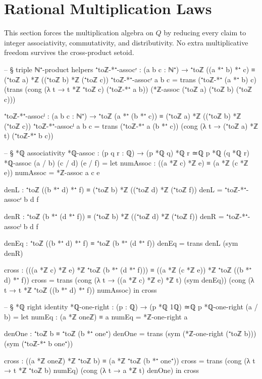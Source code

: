 \documentclass[11pt,a4paper]{book}
\def\mathbb#1{#1}%
\begin{document}
\section{Rational Multiplication Laws}

This section forces the multiplication algebra on $\mathbb{Q}$ by reducing every
claim to integer associativity, commutativity, and distributivity.  No extra
multiplicative freedom survives the cross-product setoid.

\begin{code}
-- § triple ℕ⁺-product helpers
⁺toℤ-*⁺-assocʳ : (a b c : ℕ⁺) → ⁺toℤ ((a *⁺ b) *⁺ c) ≡ (⁺toℤ a) *ℤ ((⁺toℤ b) *ℤ (⁺toℤ c))
⁺toℤ-*⁺-assocʳ a b c =
  trans
    (⁺toℤ-*⁺ (a *⁺ b) c)
    (trans
      (cong (λ t → t *ℤ ⁺toℤ c) (⁺toℤ-*⁺ a b))
      (*ℤ-assoc (⁺toℤ a) (⁺toℤ b) (⁺toℤ c)))

⁺toℤ-*⁺-assocˡ : (a b c : ℕ⁺) → ⁺toℤ (a *⁺ (b *⁺ c)) ≡ (⁺toℤ a) *ℤ ((⁺toℤ b) *ℤ (⁺toℤ c))
⁺toℤ-*⁺-assocˡ a b c =
  trans
    (⁺toℤ-*⁺ a (b *⁺ c))
    (cong (λ t → (⁺toℤ a) *ℤ t) (⁺toℤ-*⁺ b c))

-- § *ℚ associativity
*ℚ-assoc : (p q r : ℚ) → (p *ℚ q) *ℚ r ≃ℚ p *ℚ (q *ℚ r)
*ℚ-assoc (a / b) (c / d) (e / f) =
  let
    numAssoc : ((a *ℤ c) *ℤ e) ≡ (a *ℤ (c *ℤ e))
    numAssoc = *ℤ-assoc a c e

    denL : ⁺toℤ ((b *⁺ d) *⁺ f) ≡ (⁺toℤ b) *ℤ ((⁺toℤ d) *ℤ (⁺toℤ f))
    denL = ⁺toℤ-*⁺-assocʳ b d f

    denR : ⁺toℤ (b *⁺ (d *⁺ f)) ≡ (⁺toℤ b) *ℤ ((⁺toℤ d) *ℤ (⁺toℤ f))
    denR = ⁺toℤ-*⁺-assocˡ b d f

    denEq : ⁺toℤ ((b *⁺ d) *⁺ f) ≡ ⁺toℤ (b *⁺ (d *⁺ f))
    denEq = trans denL (sym denR)

    cross : (((a *ℤ c) *ℤ e) *ℤ ⁺toℤ (b *⁺ (d *⁺ f))) ≡ ((a *ℤ (c *ℤ e)) *ℤ ⁺toℤ ((b *⁺ d) *⁺ f))
    cross =
      trans
        (cong (λ t → ((a *ℤ c) *ℤ e) *ℤ t) (sym denEq))
        (cong (λ t → t *ℤ ⁺toℤ ((b *⁺ d) *⁺ f)) numAssoc)
  in
  cross

-- § *ℚ right identity
*ℚ-one-right : (p : ℚ) → (p *ℚ 1ℚ) ≃ℚ p
*ℚ-one-right (a / b) =
  let
    numEq : (a *ℤ oneℤ) ≡ a
    numEq = *ℤ-one-right a

    denOne : ⁺toℤ b ≡ ⁺toℤ (b *⁺ one⁺)
    denOne =
      trans
        (sym (*ℤ-one-right (⁺toℤ b)))
        (sym (⁺toℤ-*⁺ b one⁺))

    cross : ((a *ℤ oneℤ) *ℤ ⁺toℤ b) ≡ (a *ℤ ⁺toℤ (b *⁺ one⁺))
    cross =
      trans
        (cong (λ t → t *ℤ ⁺toℤ b) numEq)
        (cong (λ t → a *ℤ t) denOne)
  in
  cross


\end{code}
\end{document}
